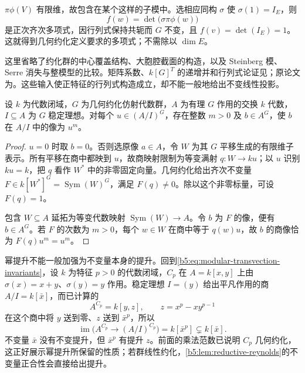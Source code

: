 \begin{proofsketch}
	\(\pi\phi(V)\) 有限维，故包含在某个这样的子模中。选相应同构 \(\sigma\) 使 \(\sigma(1)=I_E\)，则
	\[
		f(w)=\det\bigl(\sigma\pi\phi(w)\bigr)
	\]
	是正次齐次多项式，因行列式保持共轭而 \(G\) 不变，且 \(f(v)=\det(I_E)=1\)。这就得到几何约化定义要求的多项式；不需除以 \(\dim E\)。

	这里省略了约化群的中心覆盖结构、大胞腔截面的构造，以及 Steinberg 模、Serre 消失与整模型的比较。矩阵系数、\(k[G]^T\) 的递增并和行列式论证见\cite[Section 3, Propositions 1--2, pp. 140--143]{Demazure1976MumfordConjecture}；原论文为\cite{Haboush1975GeometricallyReductive}。这些输入使正特征的行列式构造成立，却不能一般地给出不变线性投影。
\end{proofsketch}

\begin{lemma}[不变量的幂提升]\label{b5:lem:geometric-reductive-power-lifting}
	设 \(k\) 为代数闭域，\(G\) 为几何约化仿射代数群，\(A\) 为有理 \(G\) 作用的交换 \(k\) 代数，\(I\subseteq A\) 为 \(G\) 稳定理想。对每个 \(u\in(A/I)^G\)，存在整数 \(m>0\) 及 \(b\in A^G\)，使 \(b\) 在 \(A/I\) 中的像为 \(u^m\)。
\end{lemma}
\begin{proof}
	\(u=0\) 时取 \(b=0\)。否则选原像 \(a\in A\)，令 \(W\) 为其 \(G\) 平移生成的有限维子表示。所有平移在商中都映到 \(u\)，故商映射限制为等变满射 \(q:W\to ku\)；以 \(u\) 识别 \(ku=k\)，把 \(q\) 看作 \(W^*\) 中的非零固定向量。几何约化给出齐次不变量 \(F\in k[W^*]^G=\operatorname{Sym}(W)^G\)，满足 \(F(q)\ne0\)。除以这个非零标量，可设 \(F(q)=1\)。

	包含 \(W\subseteq A\) 延拓为等变代数映射 \(\operatorname{Sym}(W)\to A\)。令 \(b\) 为 \(F\) 的像，便有 \(b\in A^G\)。若 \(F\) 的次数为 \(m>0\)，每个 \(w\in W\) 在商中等于 \(q(w)u\)，故 \(b\) 的商像恰为 \(F(q)u^m=u^m\)。
\end{proof}

幂提升不能一般加强为不变量本身的提升。回到\eqref{b5:eq:modular-transvection-invariants}，设 \(k\) 为特征 \(p>0\) 的代数闭域，\(C_p\) 在 \(A=k[x,y]\) 上由 \(\sigma(x)=x+y\)、\(\sigma(y)=y\) 作用。稳定理想 \(I=(y)\) 给出平凡作用的商 \(A/I=k[\bar x]\)，而已计算的
\[
	A^{C_p}=k[y,z],\qquad z=x^p-xy^{p-1}
\]
在这个商中将 \(y\) 送到零、\(z\) 送到 \(\bar x^p\)，所以
\[
	\operatorname{im}\bigl(A^{C_p}\longrightarrow(A/I)^{C_p}\bigr) =k[\bar x^p]\subsetneq k[\bar x].
\]
不变量 \(\bar x\) 没有不变提升，但 \(\bar x^p\) 有提升 \(z\)。前面的乘法范数已说明 \(C_p\) 几何约化，这正好展示幂提升所保留的性质；若群线性约化，\cref{b5:lem:reductive-reynolds}的不变量正合性会直接给出提升。

